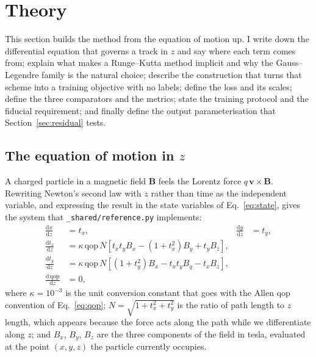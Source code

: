 \documentclass[11pt,a4paper]{article}
\newcommand{\qop}{\ensuremath{\mathrm{qop}}}
\begin{document}
\section{Theory}
\label{sec:theory}

This section builds the method from the equation of motion up. I write down the
differential equation that governs a track in $z$ and say where each term comes
from; explain what makes a Runge--Kutta method implicit and why the
Gauss--Legendre family is the natural choice; describe the construction that
turns that scheme into a training objective with no labels; define the loss and
its scales; define the three comparators and the metrics; state the training
protocol and the fiducial requirement; and finally define the output
parameterisation that Section~\ref{sec:residual} tests.

\subsection{The equation of motion in \texorpdfstring{$z$}{z}}
\label{sec:eom}

A charged particle in a magnetic field $\mathbf{B}$ feels the Lorentz force
$q\,\mathbf{v} \times \mathbf{B}$. Rewriting Newton's second law with $z$ rather
than time as the independent variable, and expressing the result in the state
variables of Eq.~\eqref{eq:state}, gives the system that
\texttt{\_shared/reference.py} implements:
%
\begin{align}
  \frac{\mathrm{d}x}{\mathrm{d}z} &= t_x,
  &\frac{\mathrm{d}y}{\mathrm{d}z} &= t_y,
  \label{eq:eom1}\\[4pt]
  \frac{\mathrm{d}t_x}{\mathrm{d}z}
    &= \kappa\,\qop\,N\left[t_x t_y B_x - (1 + t_x^2) B_y + t_y B_z\right],
  \label{eq:eom2}\\[2pt]
  \frac{\mathrm{d}t_y}{\mathrm{d}z}
    &= \kappa\,\qop\,N\left[(1 + t_y^2) B_x - t_x t_y B_y - t_x B_z\right],
  \label{eq:eom3}\\[2pt]
  \frac{\mathrm{d}\,\qop}{\mathrm{d}z} &= 0,
  \label{eq:eom4}
\end{align}
%
where $\kappa = 10^{-3}$ is the unit conversion constant that goes with the
Allen $\qop$ convention of Eq.~\eqref{eq:qop};
$N = \sqrt{1 + t_x^2 + t_y^2}$ is the ratio of path length to $z$ length, which
appears because the force acts along the path while we differentiate along $z$;
and $B_x$, $B_y$, $B_z$ are the three components of the field in tesla,
evaluated at the point $(x, y, z)$ the particle currently occupies.
\end{document}
